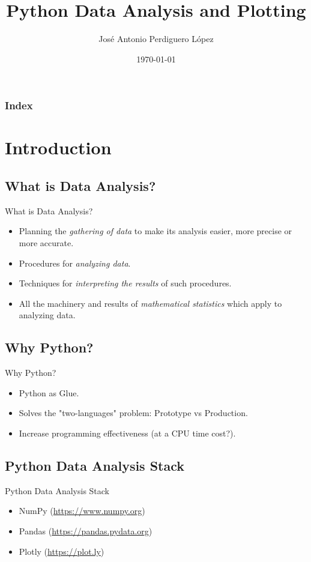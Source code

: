 \documentclass[final, 9pt, svgnames]{beamerPerdy}
\title{Python Data Analysis and Plotting}
\author[J. A. Perdiguero López]{José Antonio Perdiguero López}
\date{\today}
\institute[Málaga Python]{Málaga Python: PyDay 2016}
\begin{document}
\setcounter{tocdepth}{2}

\begin{frame}
  \titlepage
\end{frame}

\begin{frame}
  \frametitle{Index}
  \tableofcontents
\end{frame}

\section{Introduction}
  \subsection{What is Data Analysis?}
  \begin{frame}{What is Data Analysis?}
    \begin{itemize}[<+->]
      \item Planning the \emph{gathering of data} to make its analysis easier, more precise or more accurate.
      \item Procedures for \emph{analyzing data}.
      \item Techniques for \emph{interpreting the results} of such procedures.
      \item All the machinery and results of \emph{mathematical statistics} which apply to analyzing data.
    \end{itemize}
  \end{frame}

  \subsection{Why Python?}
  \begin{frame}{Why Python?}
    \begin{itemize}[<+->]
      \item Python as Glue.
      \item Solves the "two-languages" problem: Prototype vs Production.
      \item Increase programming effectiveness (at a CPU time cost?).
    \end{itemize}
  \end{frame}
  \subsection{Python Data Analysis Stack}
  \begin{frame}{Python Data Analysis Stack}
    \begin{itemize}[<+->]
      \item NumPy (\href{https://www.numpy.org}{https://www.numpy.org})
      \item Pandas (\href{https://pandas.pydata.org}{https://pandas.pydata.org})
      \item Plotly (\href{https://plot.ly}{https://plot.ly})
    \end{itemize}
  \end{frame}
\end{document}
